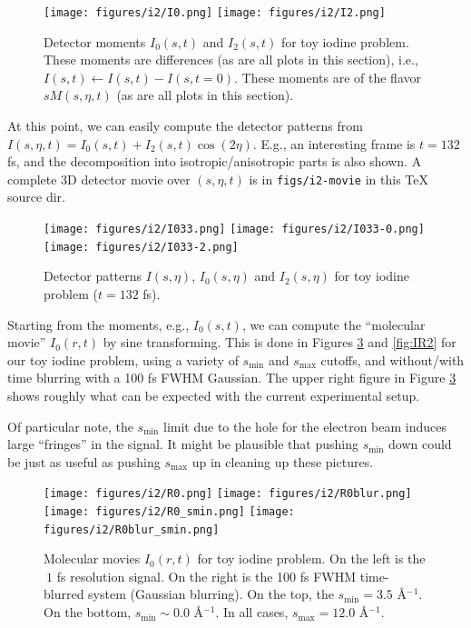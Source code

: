 \documentclass[fleqn,oneside,12pt]{article}
\begin{document}
\begin{figure}[h!]
\begin{center}
\texttt{[image: figures/i2/I0.png]}
\texttt{[image: figures/i2/I2.png]}
\caption{Detector moments $I_{0} (s, t)$ and $I_{2} (s, t)$ for toy iodine
problem. These moments are differences (as are all plots in this section), i.e.,
$I (s, t) \leftarrow I(s, t) - I(s, t=0)$. These moments are of the flavor $s
M(s, \eta, t)$ (as are all plots in this section).}
\label{fig:I02}
\end{center}
\end{figure}

At this point, we can easily compute the detector patterns from $I(s, \eta, t) =
I_{0} (s, t) + I_{2} (s, t) \cos(2 \eta)$. E.g., an interesting frame is $t=132$
fs, and the decomposition into isotropic/anisotropic parts is also shown. A
complete 3D detector movie over $(s, \eta, t)$ is in \texttt{figs/i2-movie} in
this TeX source dir.

\begin{figure}[h!]
\begin{center}
\texttt{[image: figures/i2/I033.png]}
\texttt{[image: figures/i2/I033-0.png]}
\texttt{[image: figures/i2/I033-2.png]}
\caption{Detector patterns $I (s, \eta)$, $I_{0} (s, \eta)$ and $I_{2} (s,
\eta)$ for toy iodine problem ($t = 132$ fs).}
\label{fig:Idet}
\end{center}
\end{figure}

Starting from the moments, e.g., $I_{0} (s, t)$, we can compute the ``molecular
movie'' $I_{0} (r, t)$ by sine transforming. This is done in Figures
\ref{fig:IR} and \ref{fig:IR2} for our toy iodine problem, using a variety of
$s_{\mathrm{min}}$ and $s_{\mathrm{max}}$ cutoffs, and without/with time
blurring with a 100 fs FWHM Gaussian. The upper right figure in Figure
\ref{fig:IR} shows roughly what can be expected with the current experimental
setup. 

Of particular note, the $s_{\mathrm{min}}$ limit due to the hole for the
electron beam induces large ``fringes'' in the signal. It might be plausible
that pushing $s_{\mathrm{min}}$ down could be just as useful as pushing
$s_{\mathrm{max}}$ up in cleaning up these pictures. 

\begin{figure}[h!]
\begin{center}
\texttt{[image: figures/i2/R0.png]}
\texttt{[image: figures/i2/R0blur.png]}
\texttt{[image: figures/i2/R0\_smin.png]}
\texttt{[image: figures/i2/R0blur\_smin.png]}
\caption{Molecular movies $I_0(r, t)$ for toy iodine problem.  On the left is the
$~1$ fs resolution signal. On the right is the 100 fs FWHM time-blurred system
(Gaussian blurring). On the top, the $s_{\mathrm{min}} = 3.5$ \AA{}$^{-1}$. On
the bottom, $s_{\mathrm{min}} \sim 0.0$ \AA{}$^{-1}$. In all cases,
$s_{\mathrm{max}} = 12.0$ \AA{}$^{-1}$.
}
\label{fig:IR}
\end{center}
\end{figure}
\end{document}
